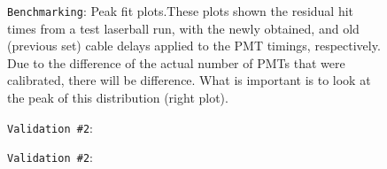 \documentclass[12pt]{article}
\begin{document}
\begin{figure}
\centering
\noindent{}
  \caption{\centering \texttt{Benchmarking}: Peak fit plots.\hspace{\textwidth}These plots shown the residual hit times from a test laserball run, with the newly obtained, and old (previous set) cable delays applied to the PMT timings, respectively. Due to the difference of the actual number of PMTs that were calibrated, there will be difference. What is important is to look at the peak of this distribution (right plot).}
  \label{fig:bench7}
\end{figure}

\begin{figure}
\centering
\noindent{}
  \caption{\centering \texttt{Validation \#2}: \hspace{\textwidth}}
  \label{fig:log0}
\end{figure}

\begin{figure}
\centering
\noindent{}
  \caption{\centering \texttt{Validation \#2}: \hspace{\textwidth}}
  \label{fig:log_gf}
\end{figure}
\end{document}
